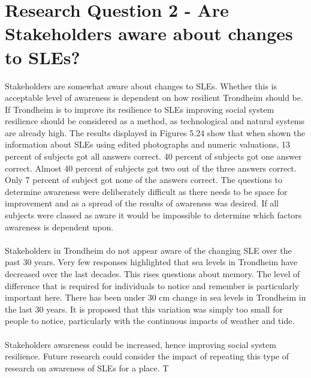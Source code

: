 \section{Research Question 2 - Are Stakeholders aware about changes to SLEs?}

Stakeholders are somewhat aware about changes to SLEs. Whether this is acceptable level of awareness is dependent on how resilient Trondheim should be. If Trondheim is to improve its resilience to SLEs improving social system resilience should be considered as a method, as technological and natural systems are already high. The results displayed in Figures 5.24 show that when shown the information about SLEs using edited photographs and numeric valuations, 13 percent of subjects got all answers correct. 40 percent of subjects got one answer correct. Almost 40 percent of subjects got two out of the three answers correct. Only 7 percent of subject got none of the answers correct. The questions to determine awareness were deliberately difficult as there needs to be space for improvement and as a spread of the results of awareness was desired. If all subjects were classed as aware it would be impossible to determine which factors awareness is dependent upon. 
\paragraph{}
Stakeholders in Trondheim do not appear aware of the changing SLE over the past 30 years. Very few responses highlighted that sea levels in Trondheim have decreased over the last decades. This rises questions about memory. The level of difference that is required for individuals to notice and remember is particularly important here. There has been under 30 cm change in sea levels in Trondheim in the last 30 years. It is proposed that this variation was simply too small for people to notice, particularly with the continuous impacts of weather and tide. 

\paragraph{}
Stakeholders awareness could be increased, hence improving social system resilience. Future research could consider the impact of repeating this type of research on awareness of SLEs for a place. T


